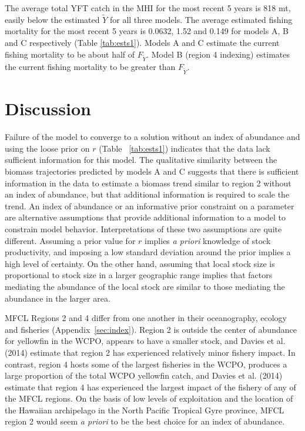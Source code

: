 \documentclass[12pt,letterpaper]{article}
\newcommand\MSY{\widetilde{Y}}
\newcommand\Fmsy{F_{\MSY}}
\begin{document}
The average total YFT catch in the MHI for the most recent 5 years
is 818 mt, easily below the estimated $\MSY$ for all three models. 
The average estimated fishing mortality for the most recent 5 years 
is 0.0632, 1.52 and 0.149 for models A, B and C respectively
(Table \ref{tab:ests1}).
Models A and C estimate the current fishing mortality to be about half
of $\Fmsy$.  Model B (region 4 indexing) estimates the current fishing
mortality to be greater than $\Fmsy$.

\section*{Discussion}
Failure of the model to converge to a solution without an index of
abundance and using the loose prior on $r$ (Table~ \ref{tab:ests1})
indicates that the data lack sufficient information for this model.
The qualitative similarity between the biomass trajectories predicted
by models A and C suggests that
there is sufficient information in the
data to estimate a biomass trend similar to region 2 without
an index of abundance, but that additional information is
required to scale the trend.
An index of abundance or an informative prior
constraint on a parameter are
alternative assumptions that provide additional information to a model
to constrain model behavior.
Interpretations of these two assumptions are quite different. 
Assuming a prior value for $r$ implies {\it a priori} knowledge of stock
productivity, and imposing a low standard deviation around the
prior implies a high level of certainty. On the other hand,
assuming that local stock size is proportional to stock size in
a larger geographic range
implies that factors mediating the abundance
of the local stock are similar to those mediating the
abundance in the larger area.

MFCL Regions 2 and 4 differ from one another in their oceanography,
ecology and fisheries (Appendix~\ref{sec:index}). 
Region 2 is outside the center of abundance for yellowfin in the
WCPO, appears to have a smaller stock, and Davies et al. (2014)
estimate that region 2 has experienced relatively minor fishery impact.
In contrast, region 4 hosts some of the largest fisheries in the WCPO,
produces a large proportion of the total WCPO yellowfin catch, and
Davies et al. (2014) estimate that region 4 has experienced
the largest impact of the fishery of any of the MFCL regions.
On the basis of low levels of exploitation and the location of the
Hawaiian archipelago in the North Pacific Tropical Gyre province, MFCL
region 2 would seem {\it a priori} to be the best choice for
an index of abundance.
\end{document}
